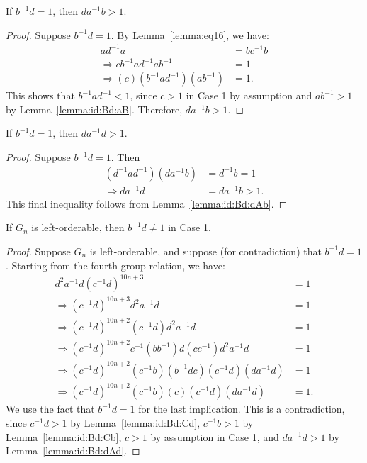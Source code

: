 \begin{lemma} If $b^{-1}d=1$, then $da^{-1}b>1$.
\label{lemma:id:Bd:dAb}
\end{lemma}
\begin{proof}  Suppose $b^{-1}d=1$. By Lemma~\ref{lemma:eq16}, we have:
\begin{align*}
ad^{-1}a&=bc^{-1}b\\
\Rightarrow{}cb^{-1}ad^{-1}ab^{-1}&=1\\
\Rightarrow{}(c)(b^{-1}ad^{-1})(ab^{-1})&=1.
\end{align*}
This shows that $b^{-1}ad^{-1}<1$, since $c>1$ in Case 1 by assumption and $ab^{-1}>1$ by Lemma~\ref{lemma:id:Bd:aB}. Therefore, $da^{-1}b>1$.
\end{proof}

\begin{lemma} If $b^{-1}d=1$, then $da^{-1}d>1$.
\label{lemma:id:Bd:dAd}
\end{lemma}
\begin{proof}  Suppose $b^{-1}d=1$. Then
\begin{align*}
(d^{-1}ad^{-1})(da^{-1}b)&=d^{-1}b=1\\
\Rightarrow{}da^{-1}d&=da^{-1}b>1.
\end{align*}
This final inequality follows from Lemma~\ref{lemma:id:Bd:dAb}.
\end{proof}

\begin{proposition} If $G_n$ is left-orderable, then $b^{-1}d\neq{}1$ in Case 1.
\label{proposition:id:Bd}
\end{proposition}
\begin{proof} Suppose $G_n$ is left-orderable, and suppose (for contradiction) that $b^{-1}d=1$. Starting from the fourth group relation, we have:
\begin{align*}
d^{2}a^{-1}d(c^{-1}d)^{10n+3}&=1\\
\Rightarrow{}(c^{-1}d)^{10n+3}d^{2}a^{-1}d&=1\\
\Rightarrow{}(c^{-1}d)^{10n+2}(c^{-1}d)d^{2}a^{-1}d&=1\\
\Rightarrow{}(c^{-1}d)^{10n+2}c^{-1}(bb^{-1})d(cc^{-1})d^{2}a^{-1}d&=1\\
\Rightarrow{}(c^{-1}d)^{10n+2}(c^{-1}b)(b^{-1}dc)(c^{-1}d)(da^{-1}d)&=1\\
\Rightarrow{}(c^{-1}d)^{10n+2}(c^{-1}b)(c)(c^{-1}d)(da^{-1}d)&=1.
\end{align*}
We use the fact that $b^{-1}d=1$ for the last implication. This is a contradiction, since $c^{-1}d>1$ by Lemma~\ref{lemma:id:Bd:Cd}, $c^{-1}b>1$ by Lemma~\ref{lemma:id:Bd:Cb}, $c>1$ by assumption in Case 1, and $da^{-1}d>1$ by Lemma~\ref{lemma:id:Bd:dAd}.
\end{proof}

